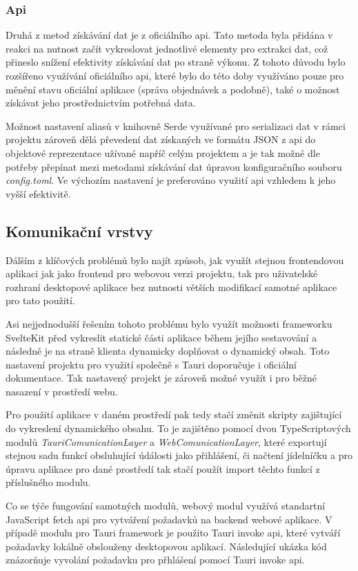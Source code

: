 \documentclass[12pt]{article}
\begin{document}
\subsubsection{Api}
Druhá z metod získávání dat je z oficiálního api. Tato metoda byla přidána v reakci na nutnost začít vykreslovat jednotlivé elementy pro extrakci dat, což přineslo snížení efektivity získávání dat po straně výkonu. Z tohoto důvodu bylo rozšířeno využívání oficiálního api, které bylo do této doby využíváno pouze pro měnění stavu oficiální aplikace (správa objednávek a podobně), také o možnost získávat jeho prostřednictvím potřebná data. 

Možnost nastavení aliasů v knihovně Serde\cite{alias} využívané pro serializaci dat v rámci projektu zároveň dělá převedení dat získaných ve formátu JSON z api do objektové reprezentace užívané napříč celým projektem a je tak možné dle potřeby přepínat mezi metodami získávání dat úpravou konfiguračního souboru \textit{config.toml}. Ve výchozím nastavení je preferováno využití api vzhledem k jeho vyšší efektivitě.

\subsection{Komunikační vrstvy}
Dálším z klíčových problémů bylo najít způsob, jak využít stejnou frontendovou aplikaci jak jako frontend pro webovou verzi projektu, tak pro uživatelské rozhraní desktopové aplikace bez nutnosti větších modifikací samotné aplikace pro tato použití.

Asi nejjednodušší řešením tohoto problému bylo využít možnosti frameworku SvelteKit před vykreslit statické části aplikace během jejího sestavování a následně je na straně klienta dynamicky doplňovat o dynamický obsah. Toto nastavení projektu pro využití společně s Tauri doporučuje i oficiální dokumentace. Tak nastavený projekt je zároveň možné využít i pro běžné nasazení v prostředí webu.

Pro použití aplikace v daném prostředí pak tedy stačí změnit skripty zajištující do vykreslení dynamického obsahu. To je zajištěno pomocí dvou TypeScriptových modulů \textit{TauriComunicationLayer} a \textit{WebComunicationLayer}, které exportují stejnou sadu funkcí obsluhující údálosti jako přihlášení, či načtení jídelníčku a pro úpravu aplikace pro dané prostředí tak stačí použít import těchto funkcí z příslušného modulu.

Co se týče fungování samotných modulů, webový modul využívá standartní JavaScript fetch api pro vytváření požadavků na backend webové aplikace. V případě modulu pro Tauri framework je použito Tauri invoke api, které vytváří požadavky lokálně obslouženy desktopovou aplikací\cite{invoke}. Následující ukázka kód znázorňuje vyvolání požadavku pro přhlášení pomocí Tauri invoke api.
\end{document}
